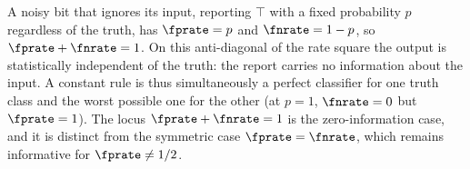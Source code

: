\begin{remark}
\label{rem:zero-information-line}
A noisy bit that ignores its input, reporting $\top$ with a fixed probability
$p$ regardless of the truth, has $\fprate = p$ and $\fnrate = 1 - p$, so
$\fprate + \fnrate = 1$. On this anti-diagonal of the rate square the output is
statistically independent of the truth: the report carries no information about
the input. A constant rule is thus simultaneously a perfect classifier for one
truth class and the worst possible one for the other (at $p = 1$, $\fnrate = 0$
but $\fprate = 1$). The locus $\fprate + \fnrate = 1$ is the zero-information
case, and it is distinct from the symmetric case $\fprate = \fnrate$, which
remains informative for $\fprate \neq 1/2$.
\end{remark}
